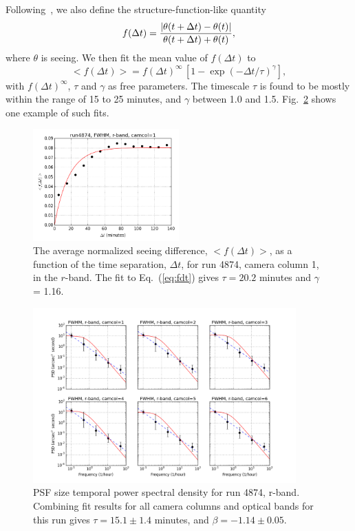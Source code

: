 Following~\cite{Racine1996}, we also define the structure-function-like quantity
\begin{equation}
       f(\Delta t) = {| \theta(t+\Delta t) - \theta(t)| \over  \theta(t+\Delta t) + \theta(t) },
\end{equation} 
where $\theta$ is seeing.
We then fit the mean value of $f(\Delta t)$ to 
\begin{equation}
    < f(\Delta t) > =  f(\Delta t) ^\infty \, \left[ 1 - \exp(-\Delta
      t/\tau)^\gamma \right],
\label{eq:fdt}
\end{equation} 
with $f(\Delta t) ^\infty$, $\tau$ and $\gamma$ as free parameters.
The timescale $\tau$ is found to be mostly within the range of 15 to
25 minutes, and $\gamma$ between 1.0 and 1.5.
Fig.~\ref{fig:fdt} shows one example of such fits.

\begin{figure}
\centering
\includegraphics[width=0.5\textwidth]{FIGURES/fdt.png}
\caption{The average normalized seeing difference, $<f(\Delta t)>$, as
  a function of the time separation, $\Delta t$, for run 4874, camera
  column 1, in the $r$-band.
The fit to Eq.~(\ref{eq:fdt}) gives $\tau = 20.2$ minutes and $\gamma$ = 1.16.
\label{fig:psd}}
\end{figure}

\begin{figure}
\centering
\includegraphics[width=0.9\textwidth]{FIGURES/temporalPSD.png}
\caption{PSF size temporal power spectral density for run 4874, r-band. 
Combining fit results for all camera columns and optical bands for
this run
gives $\tau = 15.1 \pm 1.4$ minutes, and $\beta = -1.14\pm 0.05$.
\label{fig:fdt}}
\end{figure}

